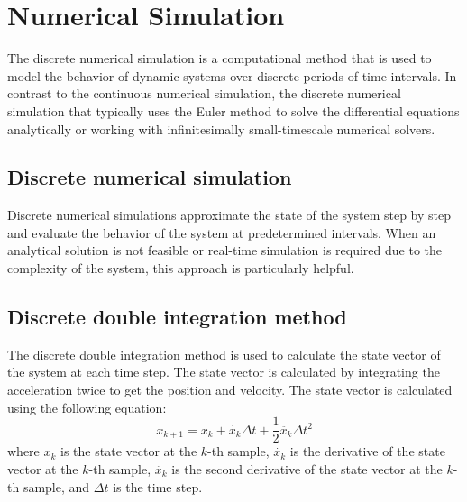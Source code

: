 \section{Numerical Simulation}
The discrete numerical simulation is a computational method that is used to model the behavior of dynamic systems over discrete periods of time intervals. In contrast to the continuous numerical simulation, the discrete numerical simulation that typically uses the Euler method to solve the differential equations analytically or working with infinitesimally small-timescale numerical solvers.
\subsection{Discrete numerical simulation}
Discrete numerical simulations approximate the state of the system step by step and evaluate the behavior of the system at predetermined intervals. When an analytical solution is not feasible or real-time simulation is required due to the complexity of the system, this approach is particularly helpful.
\subsection{Discrete double integration method}
The discrete double integration method is used to calculate the state vector of the system at each time step. The state vector is calculated by integrating the acceleration twice to get the position and velocity. The state vector is calculated using the following equation:
\begin{equation}
	x_{k+1} = x_k + \dot{x_k} \Delta t + \frac{1}{2} \ddot{x_k} \Delta t^2
\end{equation}
where $x_k$ is the state vector at the $k$-th sample, $\dot{x_k}$ is the derivative of the state vector at the $k$-th sample, $\ddot{x_k}$ is the second derivative of the state vector at the $k$-th sample, and $\Delta t$ is the time step.


